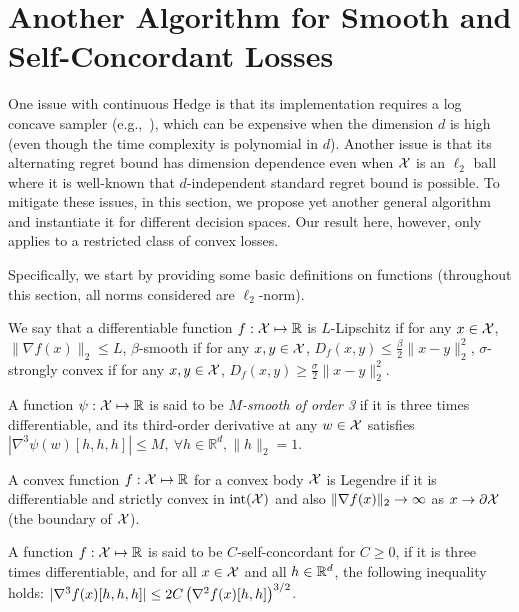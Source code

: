 \section{Another Algorithm for Smooth and Self-Concordant Losses}\label{sec:SC}

One issue with continuous Hedge is that its implementation requires a log concave sampler (e.g.,~\citet{lovasz2003geometry, lovasz2006simulated, narayanan2010random}), which can be expensive when the dimension $d$ is high (even though the time complexity is polynomial in $d$).
Another issue is that its alternating regret bound has dimension dependence even when ${\mathcal{X}}$ is an $\ell_2$ ball where it is well-known that $d$-independent standard regret bound is possible.
To mitigate these issues, in this section, we propose yet another general algorithm and instantiate it for different decision spaces.
Our result here, however, only applies to a restricted class of convex losses.

Specifically, we start by providing some basic definitions on functions (throughout this section, all norms considered are $\ell_2$-norm).
\begin{definition}\label{def:lipschitz}
    We say that  a differentiable function $f:{\mathcal{X}}\mapsto\mathbb{R}$ is $L$-Lipschitz if for any $x\in{\mathcal{X}}$, $\|\nabla f(x)\|_2 \leq L$,
    $\beta$-smooth if for any $x,y\in{\mathcal{X}}$, $D_f(x,y)\leq \frac{\beta}{2}\|x-y\|_2^2$,
     $\sigma$-strongly convex if for any $x,y\in{\mathcal{X}}$, $D_f(x,y)\geq \frac{\sigma}{2}\|x-y\|_2^2$.
\end{definition}

\begin{definition}\label{def:3rd-order smoothness}
A function $\psi:{\mathcal{X}}\mapsto\mathbb{R}$ is said to be \emph{$M$-smooth of order 3} if it is three times differentiable, and its third-order derivative at any $w\in{\mathcal{X}}$ satisfies
$
|\nabla^3 \psi(w)[h, h, h]|
\leq M,~ \forall h \in \mathbb{R}^d, \|h\|_2=1.
$
\end{definition}

\begin{definition}\label{def:Legendre}%
    A convex function $f:{\mathcal{X}}\mapsto \mathbb{R}$ for a convex body ${\mathcal{X}}$ is Legendre if it is differentiable and strictly convex in $\text{int}({\mathcal{X}})$ and also 
    $\lVert\nabla f(x)\rVert_2\rightarrow \infty$ as $x\rightarrow\partial{\mathcal{X}}$ (the boundary of ${\mathcal{X}}$).    
\end{definition}

\begin{definition}\label{def:self-concordance}\citep{nesterov1994interior}
    A function $f:{\mathcal{X}}\mapsto \mathbb{R}$ is said to be $C$-self-concordant for $C\ge0$, if it is three times differentiable, and for all $x\in{\mathcal{X}}$ and all $h\in\mathbb{R}^d$, the following inequality holds: $
    \lvert\nabla^3f(x)[h,h,h]\rvert\le2C\left(\nabla^2f(x)[h,h]\right)^{3/2}
    $.
\end{definition}

